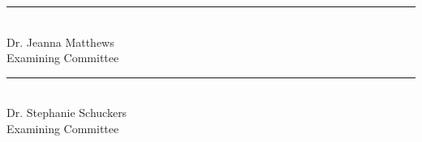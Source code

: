 \documentclass[a4paper, 11pt, oneside]{ThesisProposal}
\begin{document}
\vspace{2\baselineskip}
\mbox{\hspace{1.5in}}           \hfill  \rule{3.5in}{0.7pt}\\
\mbox{\hspace{1.5in}}           \hfill  Dr. Jeanna Matthews\\
\mbox{\hspace{1.5in}}           \hfill  Examining Committee\\

\vspace{2\baselineskip}
\mbox{\hspace{1.5in}}           \hfill  \rule{3.5in}{0.7pt}\\
\mbox{\hspace{1.5in}}           \hfill  Dr. Stephanie Schuckers\\
\mbox{\hspace{1.5in}}           \hfill  Examining Committee\\

\clearpage


\pagestyle{fancy}
\end{document}
